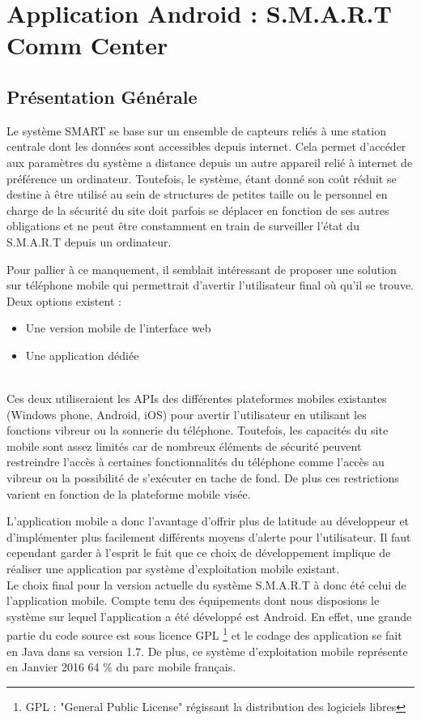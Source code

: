 



\chapter{Application Android : S.M.A.R.T Comm Center}

\section{Présentation Générale}

	Le système SMART se base sur un ensemble de capteurs reliés à une station centrale dont les données sont accessibles depuis internet. Cela permet d'accéder aux paramètres du système a distance depuis un autre appareil relié à internet de préférence un ordinateur. Toutefois, le système, étant donné son coût réduit se destine à être utilisé au sein de structures de petites taille ou le personnel en charge de la sécurité du site doit parfois se déplacer en fonction de ses autres obligations et ne peut être constamment en train de surveiller l'état du S.M.A.R.T depuis un ordinateur. 
	
	Pour pallier à ce manquement, il semblait intéressant de proposer une solution sur téléphone mobile qui permettrait d'avertir l'utilisateur final où qu'il se trouve. Deux options existent :
	~\\
	\begin{itemize}
	
	\item Une version mobile de l'interface web
	\item Une application dédiée	
		
	\end{itemize}
	~\\
	 Ces deux utiliseraient les APIs des différentes plateformes mobiles existantes (Windows phone, Android, iOS) pour avertir l'utilisateur en utilisant les fonctions vibreur ou la sonnerie du téléphone.
	 Toutefois, les capacités du site mobile sont assez limités car de nombreux éléments de sécurité peuvent restreindre l'accès à certaines fonctionnalités du téléphone comme l'accès au vibreur ou la possibilité de s'exécuter en tache de fond. De plus ces restrictions varient en fonction de la plateforme mobile visée.
	
	 L'application mobile a donc l'avantage d'offrir plus de latitude au développeur et d'implémenter plus facilement différents moyens d'alerte pour l'utilisateur. Il faut cependant garder à l'esprit le fait que ce choix de développement implique de réaliser une application par système d'exploitation mobile existant.
	~\\
	Le choix final pour la version actuelle du système S.M.A.R.T à donc été celui de l'application mobile. Compte tenu des équipements dont nous disposions le système sur lequel l'application a été développé est Android. En effet, une grande partie du code source est sous licence GPL \footnote{GPL : "General Public License" régissant la distribution des logiciels libres} et le codage des application se fait en Java dans sa version 1.7. De plus, ce système d'exploitation mobile représente en Janvier 2016 64 \% du parc mobile français.

